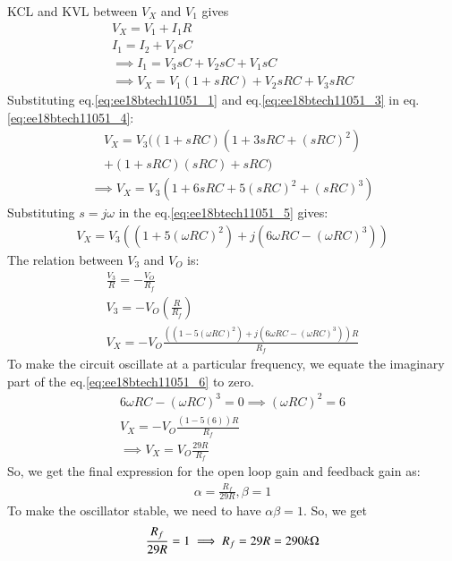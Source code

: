 \begin{enumerate}[label=\arabic*.,ref=\theenumi]
KCL and KVL between $V_{X}$ and $V_{1}$ gives 
\begin{align}
    V_{X} = V_{1} + I_{1}R\\
    I_{1} = I_{2} + V_{1}sC\\
    \implies I_{1} = V_{3}sC + V_{2}sC + V_{1}sC\\
    \implies V_{X} = V_{1}(1+sRC) + V_{2}sRC + V_{3}sRC
    \label{eq:ee18btech11051_4}
\end{align}
Substituting eq.\ref{eq:ee18btech11051_1} and eq.\ref{eq:ee18btech11051_3} in eq.\ref{eq:ee18btech11051_4}:
\begin{multline}
    V_{X} = V_{3}((1+sRC)(1+ 3sRC+ (sRC)^{2})\\+(1+sRC)(sRC)+sRC)
\end{multline}
\begin{align}
    \implies V_{X} = V_{3}(1+ 6sRC+ 5(sRC)^{2}+ (sRC)^{3}) \label{eq:ee18btech11051_5}
\end{align}
Substituting $ s = j\omega$ in the eq.\ref{eq:ee18btech11051_5} gives:
\begin{align}
    V_{X} = V_{3}((1+5(\omega RC)^{2}) + j(6\omega RC - (\omega RC)^{3})) \label{eq:ee18btech11051_6}
\end{align}
The relation between $V_{3}$ and $V_{O}$ is:
\begin{align}
    \frac{V_{3}}{R} = -\frac{V_{O}}{R_{f}}\\
     V_{3} = -V_{O}(\frac{R}{R_{f}})\\
     V_{X} = -V_{O}\frac{((1-5(\omega RC)^{2}) + j(6\omega RC - (\omega RC)^{3}))R}{R_{f}}
\end{align}
To make the circuit oscillate at a particular frequency, we equate the imaginary part of the eq.\ref{eq:ee18btech11051_6} to zero.
\begin{align}
    6\omega RC -(\omega RC)^{3}=0 \implies (\omega RC)^{2} = 6\\
    V_{X} = -V_{O}\frac{(1 - 5(6))R}{R_{f}}\\
    \implies V_{X} = V_{O}\frac{29R}{R_{f}}
\end{align}
So, we get the final expression for the open loop gain and feedback gain as:
\begin{align}
    \alpha = \frac{R_{f}}{29R}  ,   \beta = 1
\end{align}
To make the oscillator stable, we need to have $\alpha \beta = 1$. So, we get
\begin{align}
    \frac{R_{f}}{29R} = 1 \implies R_{f} = 29R = 290k\ohm
\end{align}

\end{enumerate}
